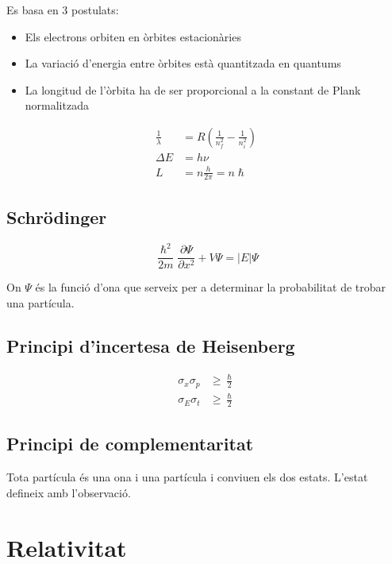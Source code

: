 Es basa en 3 postulats:

\begin{itemize}
    \item Els electrons orbiten en òrbites estacionàries
    \item La variació d'energia entre òrbites està quantitzada en quantums
    \item La longitud de l'òrbita ha de ser proporcional a la constant de Plank
        normalitzada
\end{itemize}

\begin{align}
    \frac{1}{\lambda}&=R \left( \frac{1}{n_f^2} - \frac{1}{n_i^2} \right) \\
    \Delta E &= h\nu \\
    L &= n \frac{h}{2\pi} = n\hslash
\end{align}

\subsection{Schrödinger}
\label{sub:schrodinger}

\begin{equation}
    \frac{\hslash^2}{2m} \frac{\partial \Psi}{\partial x^2} + V\Psi = |E| \Psi
\end{equation}

On $\Psi$ és la funció d'ona que serveix per a determinar la probabilitat
de trobar una partícula.

\subsection{Principi d'incertesa de Heisenberg}
\label{sub:principi_d_incertesa_de_heisenberg}

\begin{align}
    \sigma_x \sigma_p &\geq \frac{\hslash}{2} \\
    \sigma_E \sigma_t &\geq \frac{\hslash}{2}
\end{align}

\subsection{Principi de complementaritat}
\label{sub:principi_de_complementaritat}

Tota partícula és una ona i una partícula i conviuen els dos estats. L'estat
defineix amb l'observació.

\section{Relativitat}
\label{sec:relativitat}

